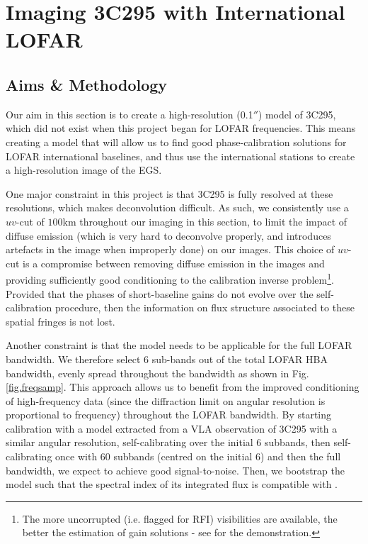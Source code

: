 \chapter{Imaging 3C295 with International LOFAR}\label{section.3c295}
\minitoc
\section{Aims \& Methodology}
\pg
Our aim in this section is to create a high-resolution (0.1$''$) model of 3C295, which did not exist when this project began for LOFAR frequencies. This means creating a model that will allow us to find good phase-calibration solutions for LOFAR international baselines, and thus use the international stations to create a high-resolution image of the EGS.

\pg
One major constraint in this project is that 3C295 is fully resolved at these resolutions, which makes deconvolution difficult. As such, we consistently use a $uv$-cut of $100$km throughout our imaging in this section, to limit the impact of diffuse emission (which is very hard to deconvolve properly, and introduces artefacts in the image when improperly done) on our images. This choice of $uv$-cut is a compromise between removing diffuse emission in the images and providing sufficiently good conditioning to the calibration inverse problem\footnote{The more uncorrupted (i.e. flagged for RFI) visibilities are available, the better the estimation of gain solutions - see  for the demonstration.}. Provided that the phases of short-baseline gains do not evolve over the self-calibration procedure, then the information on flux structure associated to these spatial fringes is not lost. 

\pg
Another constraint is that the model needs to be applicable for the full LOFAR bandwidth. We therefore select 6 sub-bands out of the total LOFAR HBA bandwidth, evenly spread throughout the bandwidth as shown in Fig. \ref{fig.freqsamp}. This approach allows us to benefit from the improved conditioning of high-frequency data (since the diffraction limit on angular resolution is proportional to frequency) throughout the LOFAR bandwidth. By starting calibration with a model extracted from a VLA observation of 3C295 with a similar angular resolution, self-calibrating over the initial 6 subbands, then self-calibrating once with 60 subbands (centred on the initial 6) and then the full bandwidth, we expect to achieve good signal-to-noise. Then, we bootstrap the model such that the spectral index of its integrated flux is compatible with .

